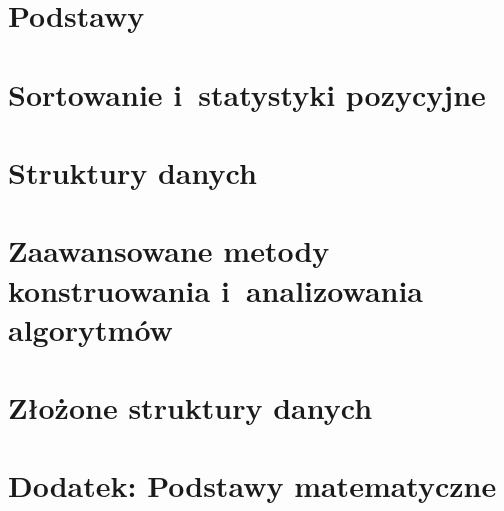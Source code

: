 \documentclass[a4paper,10pt,twoside,openany,titlepage]{book}
\begin{document}
\frontmatter


\ifpdf
\fi

\tableofcontents

\mainmatter

\part{Podstawy}







\part{Sortowanie i~statystyki pozycyjne}






\part{Struktury danych}







\part{Zaawansowane metody konstruowania i~analizowania algorytmów}





\part{Złożone struktury danych}

\setcounter{chapter}{17}


\setcounter{part}{7}
\part{Dodatek: Podstawy matematyczne}

\appendix





\backmatter

\let\chapter=\originalchapter



\nocite{*}
\end{document}
